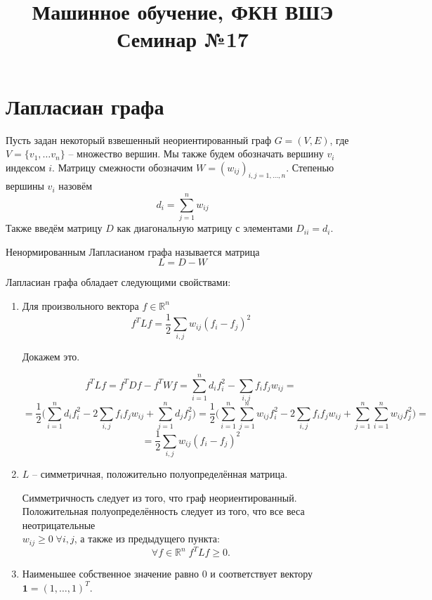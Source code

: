 \documentclass[12pt,a4paper]{article}
\title{Машинное обучение, ФКН ВШЭ\\Семинар №17}
\author{}
\date{}
\begin{document}
\maketitle

\section{Лапласиан графа}

Пусть задан некоторый взвешенный неориентированный граф $G = (V,E)$, где $V = \{v_1, \ldots v_n\}$ – множество вершин. Мы также будем обозначать вершину $v_i$ индексом $i$. Матрицу смежности обозначим $W = (w_{ij})_{i,j=1,\ldots,n}$. Степенью вершины $v_i$ назовём
\begin{equation*}
	d_{i} = \sum_{j=1}^nw_{ij}
\end{equation*}
Также введём матрицу $D$ как диагональную матрицу с элементами $D_{ii} = d_i$.

Ненормированным Лапласианом графа называется матрица
\begin{equation*}
	L = D - W
\end{equation*}

Лапласиан графа обладает следующими свойствами:
\begin{enumerate}
	\item Для произвольного вектора $f \in \mathbb{R}^n$
		\begin{equation*}
			f^T L f = \frac{1}{2} \sum_{i,j}w_{ij}(f_i -f _j)^2
		\end{equation*}
		
		Докажем это.
		
		\begin{equation*}
			f^T L f = f^T D f - f^T W f = \sum_{i=1}^n d_i f_i^2 - \sum_{i,j} f_i f_j w_{ij} =
		\end{equation*}
		\begin{equation*}
			= \frac{1}{2} \bigg( \sum_{i=1}^n d_i f_i^2 - 2\sum_{i,j} f_i f_j w_{ij} + \sum_{j=1}^n d_j f_j^2 \bigg) =
			\frac{1}{2} \bigg( \sum_{i=1}^n \sum_{j=1}^n w_{ij} f_i^2 - 2\sum_{i,j} f_i f_j w_{ij} + \sum_{j=1}^n \sum_{i=1}^n w_{ij} f_j^2 \bigg) = 
		\end{equation*}
		\begin{equation*}
			= \frac{1}{2} \sum_{i,j}w_{ij}(f_i -f _j)^2
		\end{equation*}
	\item $L$ – симметричная, положительно полуопределённая матрица.
	
		Симметричность следует из того, что граф неориентированный. Положительная полуопределённость следует из того, что все веса неотрицательные\\ 
		$w_{ij} \geq 0 \; \forall i,j$, а также из предыдущего пункта:
		\begin{equation*}
			\forall f \in \mathbb{R}^n \; f^T L f \geq 0.
		\end{equation*}
	\item Наименьшее собственное значение равно $0$ и соответствует вектору $\mathbf{1} = (1,\ldots,1)^T$.
\end{enumerate}
\end{document}
